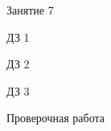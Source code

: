 \begin{class}[number=7]
	\begin{listofex}
		\item Занятие 7
	\end{listofex}
\end{class}

\begin{homework}[number=1]
	\begin{listofex}
		\item ДЗ 1
	\end{listofex}
\end{homework}

\begin{homework}[number=2]
	\begin{listofex}
		\item ДЗ 2
	\end{listofex}
\end{homework}

\begin{homework}[number=3]
	\begin{listofex}
		\item ДЗ 3
	\end{listofex}
\end{homework}

\begin{exam}
	\begin{listofex}
		\item Проверочная работа
	\end{listofex}
\end{exam}

